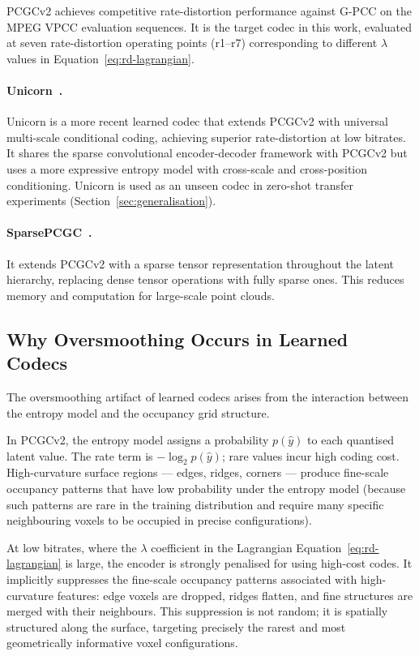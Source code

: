 PCGCv2 achieves competitive rate-distortion performance against G-PCC on
the MPEG VPCC evaluation sequences.
It is the target codec in this work, evaluated at seven rate-distortion
operating points (r1--r7) corresponding to different $\lambda$ values
in Equation~\ref{eq:rd-lagrangian}.

\paragraph{Unicorn~\cite{wang2025unicorn}.}
Unicorn is a more recent learned codec that extends PCGCv2 with universal
multi-scale conditional coding, achieving superior rate-distortion at
low bitrates.
It shares the sparse convolutional encoder-decoder framework with PCGCv2
but uses a more expressive entropy model with cross-scale and cross-position
conditioning.
Unicorn is used as an unseen codec in zero-shot transfer experiments
(Section~\ref{sec:generalisation}).

\paragraph{SparsePCGC~\cite{wang2023sparsepcgc}.}
It extends PCGCv2 with a sparse tensor
representation throughout the latent hierarchy, replacing dense tensor operations
with fully sparse ones.
This reduces memory and computation for large-scale point clouds.

\subsection{Why Oversmoothing Occurs in Learned Codecs}
\label{ssec:oversmoothing-cause}

The oversmoothing artifact of learned codecs arises from the interaction between
the entropy model and the occupancy grid structure.

In PCGCv2, the entropy model assigns a probability $p(\hat{y})$ to each
quantised latent value.
The rate term is $-\log_2 p(\hat{y})$; rare values incur high coding cost.
High-curvature surface regions --- edges, ridges, corners --- produce
fine-scale occupancy patterns that have low probability under the entropy model
(because such patterns are rare in the training distribution and require
many specific neighbouring voxels to be occupied in precise configurations).

At low bitrates, where the $\lambda$ coefficient in the Lagrangian
Equation~\ref{eq:rd-lagrangian} is large, the encoder is strongly
penalised for using high-cost codes.
It implicitly suppresses the fine-scale occupancy patterns associated with
high-curvature features: edge voxels are dropped, ridges flatten, and fine
structures are merged with their neighbours.
This suppression is not random; it is spatially structured along the
surface, targeting precisely the rarest and most geometrically informative
voxel configurations.

